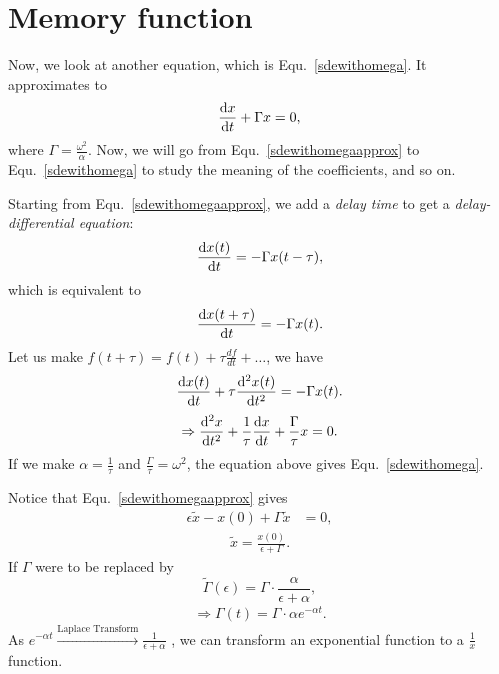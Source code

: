 \chapter{Memory function}\label{chap:memoryfunc}
Now, we look at another equation, which is Equ.~\eqref{sdewithomega}. It approximates to 
\begin{align}
\frac{{\mathrm d} {x}}{{\mathrm d}t}+ \Gamma x=0, \label {sdewithomegaapprox}
\end{align}
where $ \Gamma= \frac{\omega^2}{\alpha} $. Now, we will go from Equ.~\eqref{sdewithomegaapprox} to Equ.~\eqref{sdewithomega} to study the meaning of the coefficients, and so on. 

Starting from Equ.~\eqref{sdewithomegaapprox}, we add a \textit{delay time} to get a \textit{delay-differential equation}:
\begin{align}
\frac{{\mathrm d} {x(t)}}{{\mathrm d}t}= -\Gamma x(t-\tau), 
\end{align}
which is equivalent to 
\begin{align}
\frac{{\mathrm d} {x(t+\tau)}}{{\mathrm d}t}= -\Gamma x(t).
\end{align}
Let us make $ f(t+\tau)= f(t)+ \tau \frac{d f}{dt}+\ldots $, we have
\begin{align}
\frac{{\mathrm d} {x(t)}}{{\mathrm d}t}+\tau \frac{{\mathrm d}^2 {x(t)}}{{\mathrm d}t^2}= -\Gamma x(t).
\end{align}
\begin{align}
\Rightarrow \frac{{\mathrm d}^2 {x}}{{\mathrm d}t^2}+ \frac{1}{\tau} \frac{{\mathrm d} {x}}{{\mathrm d}t}+ \frac{\Gamma}{\tau}x=0.
\end{align}
If we make $ \alpha = \frac{1}{\tau} $ and $ \frac{\Gamma}{\tau}=\omega^2 $, the equation above gives
Equ.~\eqref{sdewithomega}. 

Notice that Equ.~\eqref{sdewithomegaapprox} gives
\begin{align}
\epsilon \tilde{x}-x(0)+ \Gamma \tilde{x}&=0, \label {sdewithomegaapprox2}
\end{align}
\begin{align}
\boxed{\tilde{x}= \frac{x(0)}{\epsilon + \Gamma}}.
\end{align}
If  $ \Gamma $ were to be replaced by 
\begin{equation}
\tilde{\Gamma}(\epsilon)= \Gamma\cdot \frac{\alpha}{\epsilon + \alpha},
\end{equation}
\begin{align}
\Rightarrow \Gamma(t)= \Gamma \cdot \alpha e^{-\alpha t}.
\end{align}
As $ e^{-\alpha t}\xrightarrow{\text{Laplace Transform}} \frac{1}{\epsilon + \alpha} $ 
, we can transform an exponential function to a $\frac{1}{x}$ function. 

